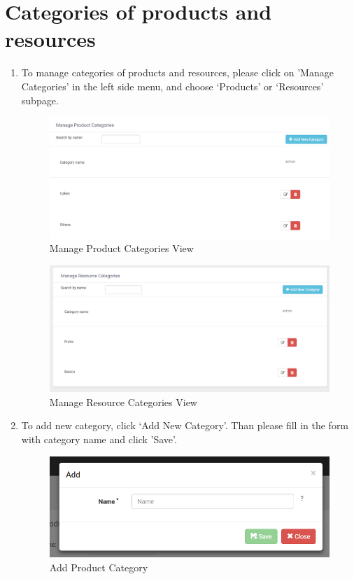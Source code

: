 \documentclass[a4paper,11pt,twoside]{report}
\theoremstyle{definition}
\begin{document}
\section{Categories of products and resources}
\begin{enumerate}
\item To manage categories of products and resources, please click on 'Manage Categories' in the left side menu, and choose ‘Products’ or ‘Resources’ subpage.
\begin{figure}[h!]
\begin{center}
\includegraphics[width=\textwidth]{AS/categories/product/1}
\end{center}
\caption{Manage Product Categories View}
\end{figure}

\begin{figure}[h!]
\begin{center}
\includegraphics[width=\textwidth]{AS/categories/resource/1}
\end{center}
\caption{Manage Resource Categories View}
\end{figure}

\item To add new category, click ‘Add New Category’. Than please fill in the form with category name and click 'Save'.
\begin{figure}[h!]
\begin{center}
\includegraphics[width=\textwidth]{AS/categories/product/2}
\end{center}
\caption{Add Product Category}
\end{figure}



\end{enumerate}
\end{document}
